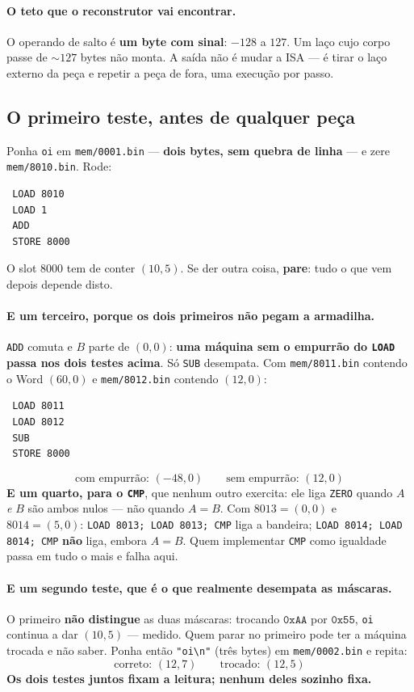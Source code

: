 \documentclass[11pt]{article}
\newcommand{\code}[1]{\texttt{\small #1}}
\theoremstyle{plain}
\theoremstyle{remark}
\begin{document}
\paragraph{O teto que o reconstrutor vai encontrar.} O operando de salto é
\textbf{um byte com sinal}: $-128$ a $127$. Um laço cujo corpo passe de
$\sim127$ bytes não monta. A saída não é mudar a ISA --- é tirar o laço
externo da peça e repetir a peça de fora, uma execução por passo.

\subsection{O primeiro teste, antes de qualquer peça}

Ponha \code{oi} em \code{mem/0001.bin} --- \textbf{dois bytes, sem quebra de
linha} --- e zere \code{mem/8010.bin}. Rode:

\begin{verbatim}
 LOAD 8010
 LOAD 1
 ADD
 STORE 8000
\end{verbatim}

\noindent O slot $8000$ tem de conter $(10,5)$. Se der outra coisa,
\textbf{pare}: tudo o que vem depois depende disto.

\paragraph{E um terceiro, porque os dois primeiros não pegam a armadilha.}
\code{ADD} comuta e $B$ parte de $(0,0)$: \textbf{uma máquina sem o empurrão do
\code{LOAD} passa nos dois testes acima}. Só \code{SUB} desempata. Com
\code{mem/8011.bin} contendo o Word $(60,0)$ e \code{mem/8012.bin} contendo
$(12,0)$:
\begin{verbatim}
 LOAD 8011
 LOAD 8012
 SUB
 STORE 8000
\end{verbatim}
\[
\text{com empurrão: } (-48,0)\qquad\text{sem empurrão: } (12,0)
\]
\textbf{E um quarto, para o \code{CMP}}, que nenhum outro exercita: ele liga
\code{ZERO} quando $A$ \emph{e} $B$ são ambos nulos --- não quando $A=B$. Com
$8013=(0,0)$ e $8014=(5,0)$: \code{LOAD 8013; LOAD 8013; CMP} liga a bandeira;
\code{LOAD 8014; LOAD 8014; CMP} \textbf{não} liga, embora $A=B$. Quem
implementar \code{CMP} como igualdade passa em tudo o mais e falha aqui.

\paragraph{E um segundo teste, que é o que realmente desempata as máscaras.} O primeiro
\textbf{não distingue} as duas máscaras: trocando $\mathtt{0xAA}$ por
$\mathtt{0x55}$, \code{oi} continua a dar $(10,5)$ --- medido. Quem parar no
primeiro pode ter a máquina trocada e não saber. Ponha então \code{"oi\textbackslash n"}
(três bytes) em \code{mem/0002.bin} e repita:
\[
\text{correto: } (12,7)\qquad\text{trocado: } (12,5)
\]
\textbf{Os dois testes juntos fixam a leitura; nenhum deles sozinho fixa.}
\end{document}
